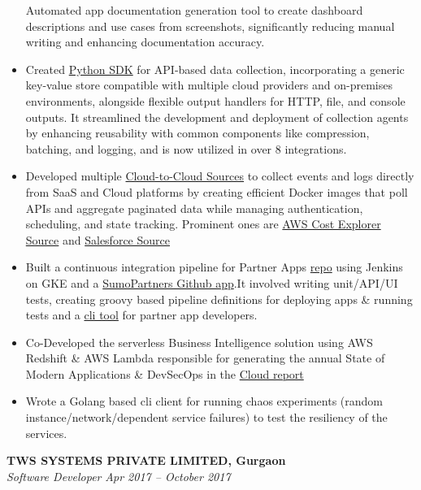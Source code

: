 \documentclass[margin,line]{resume}
\begin{document}
\begin{resume}
\begin{itemize}
                \subitem Automated app documentation generation tool to create dashboard descriptions and use cases from screenshots, significantly reducing manual writing and enhancing documentation accuracy.
            \item Created \href{https://pypi.org/project/sumologic-appclient-sdk/}{Python SDK} for API-based data collection, incorporating a generic key-value store compatible with multiple cloud providers and on-premises environments, alongside flexible output handlers for HTTP, file, and console outputs. It streamlined the development and deployment of collection agents by enhancing reusability with common components like compression, batching, and logging, and is now utilized in over 8 integrations.
            \item Developed multiple \href{https://help.sumologic.com/docs/send-data/hosted-collectors/cloud-to-cloud-integration-framework/}{Cloud-to-Cloud Sources} to collect events and logs directly from SaaS and Cloud platforms by creating efficient Docker images that poll APIs and aggregate paginated data while managing authentication, scheduling, and state tracking. Prominent ones are
             \href{https://help.sumologic.com/docs/send-data/hosted-collectors/cloud-to-cloud-integration-framework/aws-cost-explorer-source/}{AWS Cost Explorer Source} and \href{https://help.sumologic.com/docs/send-data/hosted-collectors/cloud-to-cloud-integration-framework/salesforce-source/}{Salesforce Source}
            \item Built a continuous integration pipeline for Partner Apps \href{https://github.com/SumoLogic/sumologic-public-partner-apps}{repo} using Jenkins on GKE and a \href{https://github.com/apps/sumopartners}{SumoPartners Github app}.It involved writing unit/API/UI tests, creating groovy based pipeline definitions for deploying apps \& running tests and a \href{https://pypi.org/project/sumologic-apptestutils/}{cli tool} for partner app developers.
            \item Co-Developed the serverless Business Intelligence solution  using AWS Redshift \& AWS Lambda responsible for generating the annual State of Modern Applications \& DevSecOps in the \href{https://www.sumologic.com/brief/state-modern-apps-report/}{Cloud report}
            \item Wrote a Golang based cli client for running chaos experiments (random instance/network/dependent service failures) to test the resiliency of the services.
        \end{itemize}
    \textbf{TWS SYSTEMS PRIVATE LIMITED, Gurgaon}\\
           \textsl{Software Developer} \hfill \textsl{Apr 2017 -- October 2017} \vspace{1mm}%
    \begin{itemize}


\end{itemize}
\end{resume}
\end{document}
